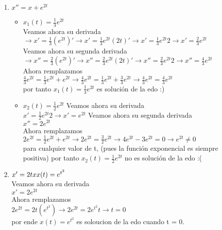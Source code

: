 \documentclass{article}
\begin{document}
    \begin{enumerate}
        \item $x''= x +e^{2t}$
            \begin{itemize}
                \item  $x_{1}(t)=\frac{1}{3}e^{2t}$\\
                Veamos ahora su derivada\\
                $\rightarrow x'=\frac{1}{3}(e^{2t})' \rightarrow x'=\frac{1}{3}e^{2t}(2t)' \rightarrow x'=\frac{1}{3}e^{2t}2
                \rightarrow x'=\frac{2}{3}e^{2t}$\\
                Veamos ahora su segunda derivada\\
                $\rightarrow x''=\frac{2}{3}(e^{2t})' \rightarrow x''=\frac{2}{3}e^{2t}(2t)' \rightarrow x''=\frac{2}{3}e^{2t}2
                \rightarrow x''=\frac{4}{3}e^{2t}$\\ 
                Ahora remplazamos\\
                $\frac{4}{3}e^{2t}= \frac{1}{3}e^{2t} +e^{2t} \rightarrow \frac{4}{3}e^{2t} =  \frac{1}{3}e^{2t} + \frac{3}{3}e^{2t} 
                \rightarrow \frac{4}{3}e^{2t} = \frac{4}{3}e^{2t}$
                \\ por tanto $x_{1}(t)=\frac{1}{3}e^{2t}$ es solución de la edo :)
                
                \item $x_{2}(t)=\frac{1}{2}e^{2t}$
                Veamos ahora su derivada\\
                $x'=\frac{1}{2}e^{2t}2 \rightarrow x'=e^{2t}$
                Veamos ahora su segunda derivada\\
                $x''= 2e^{2t}$\\ 
                Ahora remplazamos\\
                $2e^{2t}= \frac{1}{2}e^{2t} + e^{2t} \rightarrow 2e^{2t} =  \frac{3}{2}e^{2t} \rightarrow 4e^{2t} - 3e^{2t} =0
                \rightarrow e^{2t} \not = 0$\\ para cualquier valor de t, (pues la función exponencial es siempre positiva) 
                por tanto $x_{2}(t)=\frac{1}{2}e^{2t}$ no es solución de la edo :(
            \end{itemize}
       

        

        \item $x'=2tx\\  x(t)=e^{t^{2}}$\\ 
        Veamos ahora su derivada\\
        $x'=2e^{2t}$\\
        Ahora remplazamos\\
        $2e^{2t}= 2t(e^{t^{2}}) \rightarrow 2e^{2t}= 2e^{t^{2}}t \rightarrow t = 0$\\
        por ende $x(t)=e^{t^{2}}$ es soloucion de la edo cuando t = 0. 
        

\end{enumerate}
\end{document}
